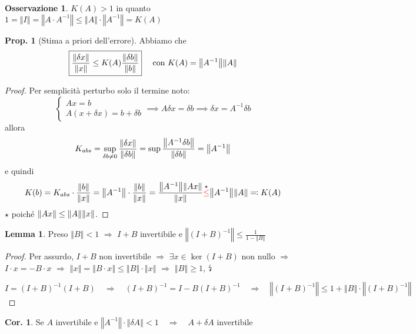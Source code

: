 \documentclass[a4paper,10pt]{article}
\theoremstyle{definition}
\theoremstyle{indentdefinition}
\theoremstyle{indenttheorem}
\newtheorem{prop}{Prop.}
\newtheorem{lem}{Lemma}
\newtheorem{cor}{Cor.}
\theoremstyle{myremark}
\newtheorem*{rem*}{Osservazione}
\theoremstyle{indentgeneral}
\theoremstyle{plain}
\theoremstyle{plain}
\begin{document}
\begin{rem*}
$K\left(A\right)>1$ in quanto $1=\left\Vert I\right\Vert =\left\Vert A\cdot A^{-1}\right\Vert \leq\left\Vert A\right\Vert \cdot\left\Vert A^{-1}\right\Vert =K\left(A\right)$
\end{rem*}


\begin{prop}[Stima a priori dell'errore]
   Abbiamo che 
$$\boxed{\frac{\norm{\delta x}}{\norm{x}}\le K(A)\frac{\norm{\delta b}}{\norm{b}}} \quad \text{ con } K(A)=\norm{A^{-1}}\norm{A}$$
\end{prop}

\begin{proof}
      Per semplicità perturbo solo il termine noto:
$$\begin{cases}
    Ax=b \\
    A\left(x+\delta x\right)=b+\delta b 
\end{cases}\implies A\delta x=\delta b\implies \delta x=A^{-1}\delta b$$
allora
$$K_{abs}=\sup_{\delta  b\ne 0}\frac{\norm{\delta x}}{\norm{\delta b}}=\sup\frac{\norm{A^{-1}\delta b}}{\norm{\delta b}}=\norm{A^{-1}}$$
e quindi 
$$K(b)=K_{abs}\cdot\frac{\norm{b}}{\norm{x}}=\norm{A^{-1}}\cdot\frac{\norm{b}}{\norm{x}}=\frac{\norm{A^{-1}}\norm{Ax}}{\norm{x}}\overset{\star}{\textcolor{red}{\le}}\norm{A^{-1}}\norm{A}\eqqcolon K(A) $$
$\star$ poiché $\norm{Ax}\le\norm{A}\norm{x}$.
\end{proof}

\begin{lem}
\label{lem:invertibilita-matrice-perturbata}Preso $\left\Vert B\right\Vert <1$
$\Longrightarrow$ $I+B$ invertibile e $\left\Vert \left(I+B\right)^{-1}\right\Vert \leq\frac{1}{1-\left\Vert B\right\Vert }$
\end{lem}

\begin{proof}
Per assurdo, $I+B$ non invertibile $\Longrightarrow$ $\exists x\in\ker\left(I+B\right)$
non nullo $\Longrightarrow$ $I\cdot x=-B\cdot x$ $\Longrightarrow$
$\left\Vert x\right\Vert =\left\Vert B\cdot x\right\Vert \leq\left\Vert B\right\Vert \cdot\left\Vert x\right\Vert $
$\Longrightarrow$ $\left\Vert B\right\Vert \geq1$, $\text{\lightning}$

\[
I=\left(I+B\right)^{-1}\left(I+B\right)\quad\Longrightarrow\quad\left(I+B\right)^{-1}=I-B\left(I+B\right)^{-1}\quad\Longrightarrow\quad\left\Vert \left(I+B\right)^{-1}\right\Vert \leq1+\left\Vert B\right\Vert \cdot\left\Vert \left(I+B\right)^{-1}\right\Vert 
\]
\end{proof}
\begin{cor}
Se $A$ invertibile e $\left\Vert A^{-1}\right\Vert \cdot\left\Vert \delta A\right\Vert <1\quad\Longrightarrow\quad A+\delta A$
invertibile

\end{cor}
\end{document}
